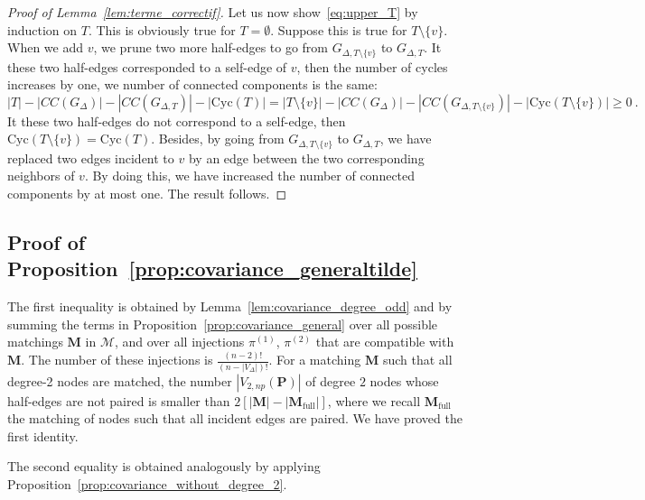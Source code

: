 \documentclass{article}
\begin{document}
\begin{proof}[Proof of Lemma~\ref{lem:terme_correctif}]
    Let us now show~\eqref{eq:upper_T}  by induction on $T$. This is obviously true for $T=\emptyset$. Suppose this is true for $T\setminus\{v\}$. When we add $v$, we prune two more half-edges to go from $G_{\Delta,T\setminus \{v\}}$ to $G_{\Delta,T}$. It these two half-edges corresponded to a self-edge of $v$, then the number of cycles increases by one, we number of connected components is the same:  
    \[
    |T|- |CC(G_{\Delta})| -|CC(G_{\Delta,T})|- |\mathrm{Cyc}(T)| = |T\setminus\{v\}|- |CC(G_{\Delta})| -|CC(G_{\Delta,T\setminus\{v\}})|- |\mathrm{Cyc}(T\setminus\{v\})| \geq 0\ . 
    \]
    It these two half-edges do not correspond to a self-edge, then $\mathrm{Cyc}(T\setminus\{v\})= \mathrm{Cyc}(T)$. Besides, by going from $G_{\Delta,T\setminus\{v\}}$ to $G_{\Delta,T}$, we have replaced two edges incident to $v$ by an edge between the two corresponding neighbors of $v$. By doing this, we have increased the number of connected components by at most one. The result follows. 
    
\end{proof}    


    \subsection{Proof of Proposition~\ref{prop:covariance_generaltilde}}


        The first inequality is obtained by Lemma~\ref{lem:covariance_degree_odd} and by summing the terms in Proposition~\ref{prop:covariance_general} over all possible matchings $\mathbf M$ in $\mathcal{M}$, and over all injections $\pi^{(1)}$, $\pi^{(2)}$ that are compatible with $\mathbf M$. The number of these injections  is $\frac{(n-2)!}{(n-|V_{\Delta}|)!}$.  For a matching ${\mathbf M}$ such that all degree-2 nodes are matched, the number $|V_{2,np}(\mathbf{P})|$ of degree $2$ nodes whose half-edges are not paired is smaller than $2[|\mathbf{M}| - |\mathbf{M}_{\mathrm{full}}|]$, where we recall $\mathbf{M}_{\mathrm{full}}$ the matching of nodes such that all incident edges are paired. We have proved the first identity. 

        The second equality is obtained analogously by applying Proposition~\ref{prop:covariance_without_degree_2}.
    
    
    
\end{document}
